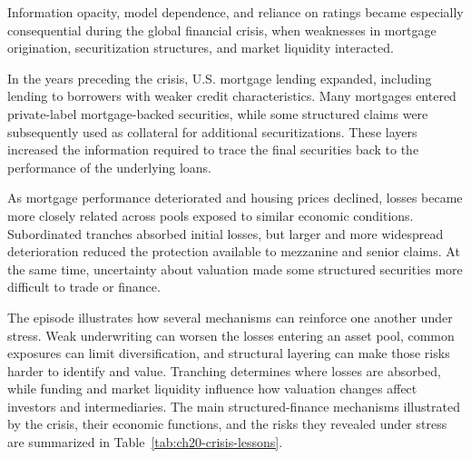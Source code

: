 Information opacity, model dependence, and reliance on ratings became especially consequential during the global financial crisis, when weaknesses in mortgage origination, securitization structures, and market liquidity interacted.

In the years preceding the crisis, U.S. mortgage lending expanded, including lending to borrowers with weaker credit characteristics. Many mortgages entered private-label mortgage-backed securities, while some structured claims were subsequently used as collateral for additional securitizations. These layers increased the information required to trace the final securities back to the performance of the underlying loans.

As mortgage performance deteriorated and housing prices declined, losses became more closely related across pools exposed to similar economic conditions. Subordinated tranches absorbed initial losses, but larger and more widespread deterioration reduced the protection available to mezzanine and senior claims. At the same time, uncertainty about valuation made some structured securities more difficult to trade or finance.

The episode illustrates how several mechanisms can reinforce one another under stress. Weak underwriting can worsen the losses entering an asset pool, common exposures can limit diversification, and structural layering can make those risks harder to identify and value. Tranching determines where losses are absorbed, while funding and market liquidity influence how valuation changes affect investors and intermediaries. The main structured-finance mechanisms illustrated by the crisis, their economic functions, and the risks they revealed under stress are summarized in Table~\ref{tab:ch20-crisis-lessons}.

